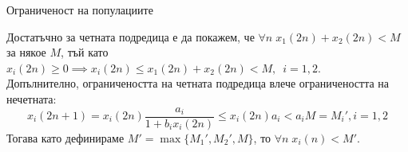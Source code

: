 \begin{frame}[t]{Ограниченост на популациите}

Достатъчно за четната подредица е да покажем, че $\forall{n} \; x_{1} \left(2n \right) + x_{2} \left(2n \right) < M$ за някое $M$, тъй като $x_{i} \left(2n \right) \geq 0 \implies x_{i} \left(2n \right) \leq x_{1} \left(2n \right) + x_{2} \left(2n \right) < M, \enspace i=1,2$. \\
Допълнително, ограничеността на четната подредица влече ограничеността на нечетната:
\[x_{i} \left(2n+1 \right) = x_{i} \left(2n \right) \frac{a_{i}}{1 + b_{i} x_{i} \left(2n \right)} \leq x_{i} \left(2n \right) a_{i} < a_{i} M = M_{i}', i=1, 2\]
Тогава като дефинираме
$M' = \max \{M_{1}',M_{2}',M\}$, то $\forall{n} \; x_{i} \left(n  \right) < M'$. \\

\end{frame}

